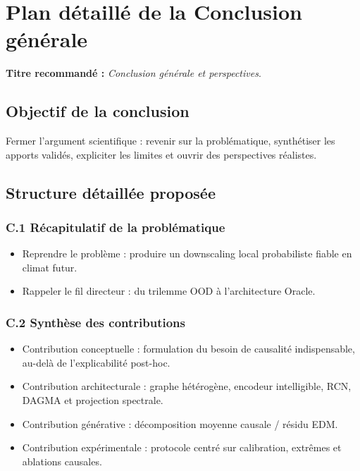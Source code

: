 \documentclass[12pt,a4paper]{article}
\begin{document}
\section{Plan d\'etaill\'e de la Conclusion g\'en\'erale}
\textbf{Titre recommand\'e :} \emph{Conclusion g\'en\'erale et perspectives}.

\subsection*{Objectif de la conclusion}
Fermer l'argument scientifique : revenir sur la probl\'ematique, synth\'etiser les apports valid\'es, expliciter les limites et ouvrir des perspectives r\'ealistes.

\subsection*{Structure d\'etaill\'ee propos\'ee}

\subsubsection*{C.1 R\'ecapitulatif de la probl\'ematique}
\begin{itemize}
    \item Reprendre le probl\`eme : produire un downscaling local probabiliste fiable en climat futur.
    \item Rappeler le fil directeur : du trilemme OOD \`a l'architecture Oracle.
\end{itemize}

\subsubsection*{C.2 Synth\`ese des contributions}
\begin{itemize}
    \item Contribution conceptuelle : formulation du besoin de causalit\'e indispensable, au-del\`a de l'explicabilit\'e post-hoc.
    \item Contribution architecturale : graphe h\'et\'erog\`ene, encodeur intelligible, RCN, DAGMA et projection spectrale.
    \item Contribution g\'en\'erative : d\'ecomposition moyenne causale / r\'esidu EDM.
    \item Contribution exp\'erimentale : protocole centr\'e sur calibration, extr\^emes et ablations causales.
\end{itemize}
\end{document}
